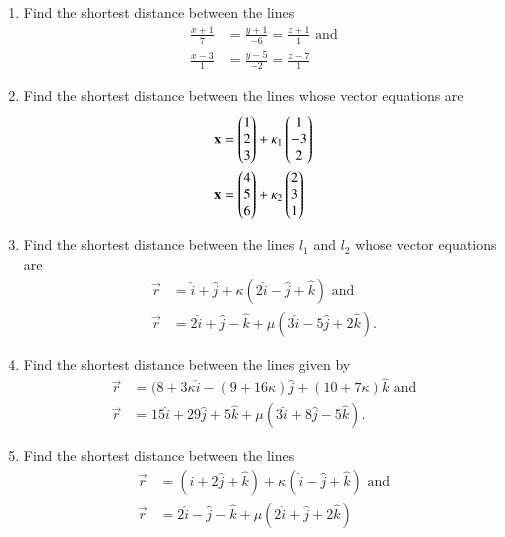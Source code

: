 \begin{enumerate}[label=\thesubsection.\arabic*,ref=\thesubsection.\theenumi]
\item Find the shortest distance between the lines
\begin{align}
	\frac{x+1}{7}&=\frac{y+1}{-6}=\frac{z+1}{1} \text{ and}
	\\
	\frac{x-3}{1}&=\frac{y-5}{-2}=\frac{z-7}{1}
\end{align}
    \solution
		
    \item Find the shortest distance between the lines whose vector equations are
    \begin{align}
\begin{split}
	\mathbf{x} &= \begin{pmatrix}1\\2\\3\end{pmatrix} + \kappa_1\begin{pmatrix}1\\-3\\2\end{pmatrix}
	\\
	\mathbf{x} &= \begin{pmatrix}4\\5\\6\end{pmatrix} + \kappa_2\begin{pmatrix}2\\3\\1\end{pmatrix}
\end{split}
        \label{eq:chapters/12/11/2/16/L2/svd}
    \end{align}
    \solution
		
\item Find the shortest distance between the lines $l_1$ and $l_2$ whose vector equations are 
\begin{align}
	\overrightarrow{r} &= \hat{i}+\hat{j}+\kappa(2\hat{i}-\hat{j}+\hat{k}) \text{ and}
	\\
	\overrightarrow{r} &= 2\hat{i}+\hat{j}-\hat{k}+\mu(3\hat{i}-5\hat{j}+2\hat{k}).
\end{align}
%		
\item Find the shortest distance between the lines given by 
\begin{align}
	\overrightarrow{r}&=(8+3\kappa\hat{i}-(9+16\kappa)\hat{j}+(10+7\kappa)\hat{k} \text{ and} 
	\\
	\overrightarrow{r}&=15\hat{i}+29\hat{j}+5\hat{k}+\mu(3\hat{i}+8\hat{j}-5\hat{k}).
\end{align}
\item Find the shortest distance between the lines
\begin{align}
	\overrightarrow{r}&=(\hat{i}+2\hat{j}+\hat{k})+\kappa(\hat{i}-\hat{j}+\hat{k}) \text{ and} 
	\\
	\overrightarrow{r}&=2\hat{i}-\hat{j}-\hat{k}+\mu(2\hat{i}+\hat{j}+2\hat{k})
\end{align}
\end{enumerate}
